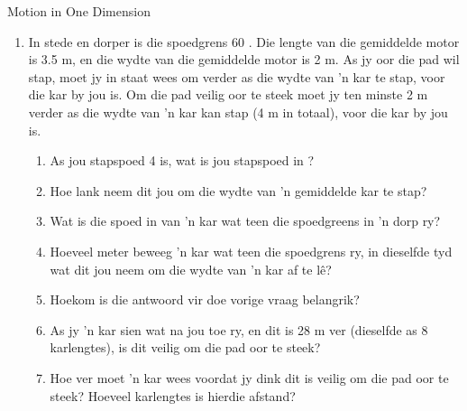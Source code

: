 \begin{eocexercises}{Motion in One Dimension}
\begin{enumerate}[noitemsep, label=\textbf{\arabic*}. ]
    \begin{enumerate}
    \item{Gebruik die grafiek om die volgende te vind:}
        \begin{enumerate}
            \item{Die spoed 5 s na die begin}
            \item{Die afstand afgel\^e in deel A}
            \item{Die versnelling in deel C}
        \end{enumerate} 
    \item Op tyd t$_1$ sny die snelheid teen tyd grafiek die tyd as. Gebruik die regte vergelyking van beweging om die waarde van tyd t$_1$ (in s) te vind.
    \item Skets die verplasing teen tyd grafiek vir die bewegin van die bal vir hierdie 12 sekondes. (Jy hoef nie die regte waardes te bereken vir elke tydinterval nie, maar gee aandag aan die algemene vorm van die grafiek vir elke interval)
    \end{enumerate}


    \item In stede en dorper is die spoedgrens 60 \kph. Die lengte van die gemiddelde motor is 3.5 m, en die wydte van die gemiddelde motor is 2 m. As jy oor die pad wil stap, moet jy in staat wees om verder as die wydte van  'n kar te stap, voor die kar by jou is. Om die pad veilig oor te steek moet jy ten minste 2 m verder as die wydte van  'n kar kan stap (4 m in totaal), voor die kar by jou is. 
    \begin{enumerate}
        \item As jou stapspoed 4 \kph is, wat is jou stapspoed in \ms?
        \item Hoe lank neem dit jou om die wydte van  'n gemiddelde kar te stap?
        \item Wat is die spoed in \ms van  'n kar wat teen die spoedgreens in  'n dorp ry?
        \item Hoeveel meter beweeg  'n kar wat teen die spoedgrens ry, in dieselfde tyd wat dit jou neem om die wydte van  'n kar af te l\^e?
        \item Hoekom is die antwoord vir doe vorige vraag belangrik?
        \item As jy  'n kar sien wat na jou toe ry, en dit is 28 m ver (dieselfde as 8 karlengtes), is dit veilig om die pad oor te steek?
        \item Hoe ver moet  'n kar wees voordat jy dink dit is veilig om die pad oor te steek? Hoeveel karlengtes is hierdie afstand?
    \end{enumerate}


\end{enumerate}
\end{eocexercises}
